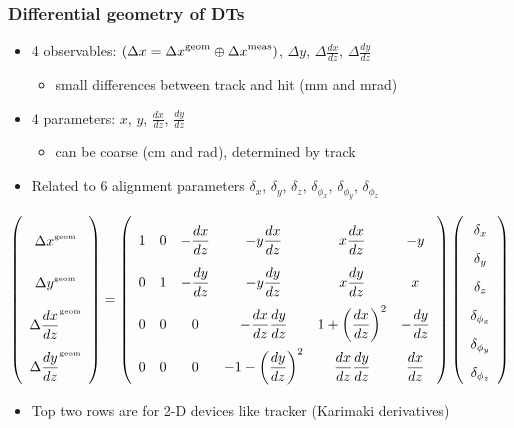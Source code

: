 \documentclass[compress]{beamer}
\begin{document}
\begin{frame}
\frametitle{Differential geometry of DTs}

\begin{itemize}
\item 4 observables: $(\Delta x = {\Delta x}^{\mbox{\scriptsize geom}} \oplus {\Delta x}^{\mbox{\scriptsize meas}})$, $\Delta y$, $\Delta \frac{dx}{dz}$, $\Delta \frac{dy}{dz}$
\begin{itemize}
\item small differences between track and hit (mm and mrad)
\end{itemize}
\item 4 parameters: $x$, $y$, $\frac{dx}{dz}$, $\frac{dy}{dz}$
\begin{itemize}
\item can be coarse (cm and rad), determined by track
\end{itemize}
\item Related to 6 alignment parameters $\delta_x$, $\delta_y$, $\delta_z$, $\delta_{\phi_x}$, $\delta_{\phi_y}$, $\delta_{\phi_z}$
\end{itemize}

\vspace{-0.5 cm}
{\scriptsize
\begin{equation*}
\renewcommand{\arraystretch}{2.5}
\left(\begin{array}{c}
{\Delta x}^{\mbox{\tiny geom}} \\
{\Delta y}^{\mbox{\tiny geom}} \\
{\Delta \dfrac{dx}{dz}}^{\mbox{\tiny geom}} \\
{\Delta \dfrac{dy}{dz}}^{\mbox{\tiny geom}} \\
\end{array}\right)
=
{\renewcommand{\arraystretch}{2.5}
\left(\begin{array}{c c c c c c}
1 & 0 & -\dfrac{dx}{dz} & -y \dfrac{dx}{dz} & x \dfrac{dx}{dz} & -y \\
0 & 1 & -\dfrac{dy}{dz} & -y \dfrac{dy}{dz} & x \dfrac{dy}{dz} & x \\
0 & 0 & 0 & -\dfrac{dx}{dz} \dfrac{dy}{dz} & 1 + \left(\dfrac{dx}{dz}\right)^2 & -\dfrac{dy}{dz} \\
0 & 0 & 0 & -1 - \left(\dfrac{dy}{dz}\right)^2 & \dfrac{dx}{dz}\dfrac{dy}{dz} & \dfrac{dx}{dz}
\end{array}\right)}
\renewcommand{\arraystretch}{1.7}
\left(\begin{array}{c}
\delta_x \\
\delta_y \\
\delta_z \\
\delta_{\phi_x} \\
\delta_{\phi_y} \\
\delta_{\phi_z}
\end{array}\right)
\label{eqn:dtmatrix}
\end{equation*}}

\vspace{-0.5 cm}
\begin{itemize}
\item Top two rows are for 2-D devices like tracker (Karimaki derivatives)
\end{itemize}
\end{frame}
\end{document}
